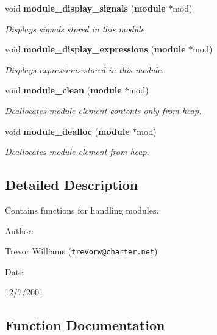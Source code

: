 \begin{CompactItemize}
void {\bf module\_\-display\_\-signals} ({\bf module} $\ast$mod)
\begin{CompactList}\small\item\em Displays signals stored in this module.\item\end{CompactList}\item 
void {\bf module\_\-display\_\-expressions} ({\bf module} $\ast$mod)
\begin{CompactList}\small\item\em Displays expressions stored in this module.\item\end{CompactList}\item 
void {\bf module\_\-clean} ({\bf module} $\ast$mod)
\begin{CompactList}\small\item\em Deallocates module element contents only from heap.\item\end{CompactList}\item 
void {\bf module\_\-dealloc} ({\bf module} $\ast$mod)
\begin{CompactList}\small\item\em Deallocates module element from heap.\item\end{CompactList}\end{CompactItemize}


\subsection{Detailed Description}
Contains functions for handling modules.



\begin{Desc}
\item[Author: ]\par
Trevor Williams ({\tt trevorw@charter.net}) \end{Desc}
\begin{Desc}
\item[Date: ]\par
12/7/2001\end{Desc}


\subsection{Function Documentation}
